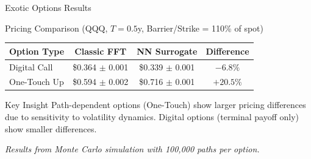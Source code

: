 \documentclass{beamer}
\begin{document}
\begin{frame}{Exotic Options Results}
    \begin{block}{Pricing Comparison (QQQ, $T=0.5$y, Barrier/Strike = 110\% of spot)}
    \end{block}

    \vspace{0.1cm}

    \begin{table}
        \centering
        \begin{tabular}{lccc}
            \toprule
            \textbf{Option Type} & \textbf{Classic FFT} & \textbf{NN Surrogate} & \textbf{Difference} \\
            \midrule
            Digital Call & \$0.364 $\pm$ 0.001 & \$0.339 $\pm$ 0.001 & $-6.8\%$ \\
            One-Touch Up & \$0.594 $\pm$ 0.002 & \$0.716 $\pm$ 0.001 & $+20.5\%$ \\
            \bottomrule
        \end{tabular}
    \end{table}

    \vspace{0.2cm}

    \begin{alertblock}{Key Insight}
        Path-dependent options (One-Touch) show larger pricing differences due to sensitivity to volatility dynamics. Digital options (terminal payoff only) show smaller differences.
    \end{alertblock}

    \vspace{0.1cm}

    \small
    \textit{Results from Monte Carlo simulation with 100,000 paths per option.}
\end{frame}
\end{document}
